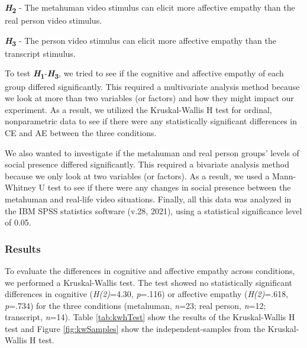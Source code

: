 \textbf{\textit{H}\textsubscript{2}} - The metahuman video stimulus can elicit more affective empathy than the real person video stimulus.

\textbf{\textit{H}\textsubscript{3}} - The person video stimulus can elicit more affective empathy than the transcript stimulus.

To test \textbf{\textit{H}\textsubscript{1}}-\textbf{\textit{H}\textsubscript{3}}, we tried to see if the cognitive and affective empathy of each group differed significantly. This required a multivariate analysis method because we look at more than two variables (or factors) and how they might impact our experiment. As a result, we utilized the Kruskal-Wallis H test for ordinal, nonparametric data to see if there were any statistically significant differences in CE and AE between the three conditions.

We also wanted to investigate if the metahuman and real person groups' levels of social presence differed significantly. This required a bivariate analysis method because we only look at two variables (or factors). As a result, we used a Mann-Whitney U test to see if there were any changes in social presence between the metahuman and real-life video situations. Finally, all this data was analyzed in the IBM SPSS statistics software (v.28, 2021), using a statistical significance level of 0.05.

\subsubsection{Results}
To evaluate the differences in cognitive and affective empathy across conditions, we performed a Kruskal-Wallis test. The test showed no statistically significant differences in cognitive (\textit{H(2)}=4.30, \textit{p}=.116) or affective empathy (\textit{H(2)}=.618, \textit{p}=.734) for the three conditions (metahuman, \textit{n}=23; real person, \textit{n}=12; transcript, \textit{n}=14). Table \ref{tab:kwhTest} show the results of the Kruskal-Wallis H test and Figure \ref{fig:kwSamples} show the independent-samples from the Kruskal-Wallis H test.

